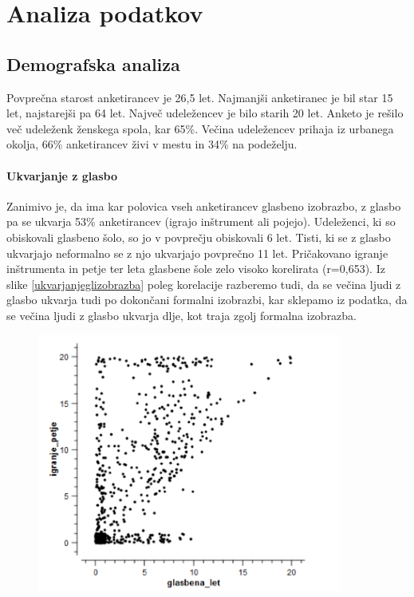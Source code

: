 \documentclass[a4paper, 12pt]{book}
\begin{document}
{\begin{table}[H]
\begin{center}
\begin{tabular}{| p{3.5cm} | p{4.5cm} | p{4.5cm} |}
\end{tabular}
\label{drugidel}
\end{center}
\end{table}

\section{Analiza podatkov}

\subsection{Demografska analiza}

Povprečna starost anketirancev je 26,5 let. Najmanjši anketiranec je bil star 15 let, najstarejši pa 64 let. Največ udeležencev je bilo starih 20 let. Anketo je rešilo več udeleženk ženskega spola, kar 65\%. Večina udeležencev prihaja iz urbanega okolja, 66\% anketirancev živi v mestu in 34\% na podeželju.

\paragraph{Ukvarjanje z glasbo}

Zanimivo je, da ima kar polovica vseh anketirancev glasbeno izobrazbo, z glasbo pa se ukvarja 53\% anketirancev (igrajo inštrument ali pojejo). Udeleženci, ki so obiskovali glasbeno šolo, so jo v povprečju obiskovali 6 let. Tisti, ki se z glasbo ukvarjajo neformalno se z njo ukvarjajo povprečno 11 let. Pričakovano igranje inštrumenta in petje ter leta glasbene šole zelo visoko korelirata (r=0,653). Iz slike \ref{ukvarjanjeglizobrazba} poleg korelacije razberemo tudi, da se večina ljudi z glasbo ukvarja tudi po dokončani formalni izobrazbi, kar sklepamo iz podatka, da se večina ljudi z glasbo ukvarja dlje, kot traja zgolj formalna izobrazba. 

\begin{figure}[hbt]
\centering
\includegraphics[width=10cm]{images/izobrazba_ukvarjanje.png}


\end{figure}}
\end{document}
